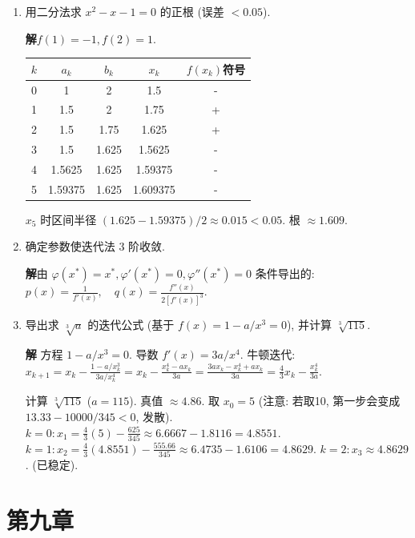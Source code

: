 \documentclass[a4paper,11pt]{ctexart}
\newcommand{\sol}{\par\noindent\textbf{解}\quad}
\begin{document}
\begin{enumerate}[label=\textbf{7-\arabic*.}, leftmargin=*]
    \item 用二分法求 $x^2 - x - 1 = 0$ 的正根 (误差 $< 0.05$).
    
    \sol $f(1)=-1, f(2)=1$.
    \begin{center}
    \begin{tabular}{|c|c|c|c|c|}
    \hline
    $k$ & $a_k$ & $b_k$ & $x_k$ & $f(x_k)$符号 \\
    \hline
    0 & 1 & 2 & 1.5 & - \\
    1 & 1.5 & 2 & 1.75 & + \\
    2 & 1.5 & 1.75 & 1.625 & + \\
    3 & 1.5 & 1.625 & 1.5625 & - \\
    4 & 1.5625 & 1.625 & 1.59375 & - \\
    5 & 1.59375 & 1.625 & 1.609375 & - \\
    \hline
    \end{tabular}
    \end{center}
    $x_5$ 时区间半径 $(1.625-1.59375)/2 \approx 0.015 < 0.05$. 根 $\approx 1.609$.

    \item[6.] 确定参数使迭代法 3 阶收敛.
    \sol 由 $\varphi(x^*) = x^*, \varphi'(x^*) = 0, \varphi''(x^*) = 0$ 条件导出的:
    $p(x) = \frac{1}{f'(x)}, \quad q(x) = \frac{f''(x)}{2[f'(x)]^3}$.

    \item[13.] 导出求 $\sqrt[3]{a}$ 的迭代公式 (基于 $f(x)=1-a/x^3=0$), 并计算 $\sqrt[3]{115}$.
    
    \sol 
    方程 $1 - a/x^3 = 0$. 导数 $f'(x) = 3a/x^4$.
    牛顿迭代: $x_{k+1} = x_k - \frac{1-a/x_k^3}{3a/x_k^4} = x_k - \frac{x_k^4 - ax_k}{3a} = \frac{3ax_k - x_k^4 + ax_k}{3a} = \frac{4}{3}x_k - \frac{x_k^4}{3a}$.
    
    计算 $\sqrt[3]{115}$ ($a=115$). 真值 $\approx 4.86$.
    取 $x_0 = 5$ (注意: 若取10, 第一步会变成 $13.33 - 10000/345 < 0$, 发散).
    $k=0: x_1 = \frac{4}{3}(5) - \frac{625}{345} \approx 6.6667 - 1.8116 = 4.8551$.
    $k=1: x_2 = \frac{4}{3}(4.8551) - \frac{555.66}{345} \approx 6.4735 - 1.6106 = 4.8629$.
    $k=2: x_3 \approx 4.8629$. (已稳定).
\end{enumerate}

\section*{第九章}
\end{document}

